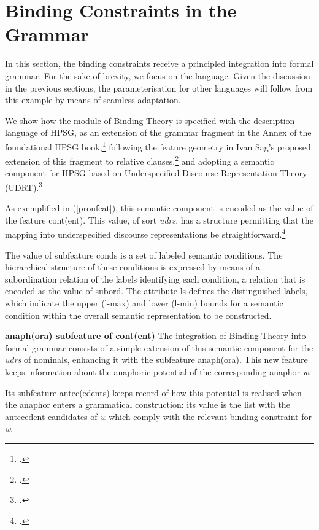 \documentclass[output=paper
	        ,collection
	        ,collectionchapter
 	        ,biblatex
                ,babelshorthands
                ,newtxmath
                ,draftmode
                ,colorlinks, citecolor=brown
]{langscibook}
\begin{document}
\section{Binding Constraints in the Grammar\label{spec1}}

In this section, the binding constraints receive
a principled integration into formal grammar. 
For the sake of brevity, 
we focus on the  language. Given the discussion in the previous sections,
the parameterisation for other languages will follow from this example by means of seamless adaptation.

We show how the module of Binding Theory is specified 
with the description language of HPSG,
as an extension of the grammar fragment in the Annex of the foundational
HPSG book,\footnote{
\citep[Annex]{polsag:hpsg94}.}
following the feature geometry in Ivan Sag's proposed extension of this fragment to relative clauses,\footnote{
\citep{Sag97a}.} and adopting a semantic component 
for HPSG based on Underspecified Discourse Representation Theory (UDRT).\footnote{
\citep{frank:sem95}.}

As exemplified in (\ref{pronfeat}), this semantic component is encoded as the value of the 
feature {\sc cont(ent)}. This value, of sort {\em udrs}, has a structure permitting that the mapping 
into underspecified discourse representations be straightforward.\footnote{
\citep{reyle:udrt93}.}


The value of subfeature {\sc conds} is a set of labeled
semantic conditions. The hierarchical structure of
these conditions is expressed by means of a subordination relation
of the labels identifying each condition, a relation that
is encoded as the value of {\sc subord}. The attribute {\sc ls} defines
the distinguished labels, which indicate the upper ({\sc l-max}) and
lower ({\sc l-min}) bounds for a semantic condition within the overall semantic
representation to be constructed.

\textbf{{\sc anaph(ora)} subfeature of {\sc cont(ent)}} The integration of Binding Theory 
into formal grammar consists of a simple extension 
of this semantic component for the {\em udrs} of nominals,
enhancing it with the subfeature {\sc anaph(ora)}. This new feature keeps information 
about the anaphoric potential of the corresponding anaphor {\it w}.

Its subfeature {\sc antec(edents)} keeps record of how this potential 
is realised when the anaphor enters a grammatical construction: 
its value is the list with the antecedent candidates of {\it w} which 
comply with the relevant binding constraint for {\it w}. 
\end{document}
